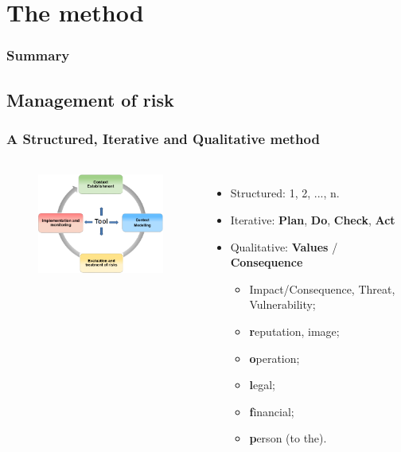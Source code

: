 
%
%
\section{The method}
\begin{frame}
    \frametitle{Summary}
\end{frame}


\subsection{Management of risk}
\begin{frame}
    \frametitle{A Structured, Iterative and Qualitative method}
    \framesubtitle{}
    \begin{columns}[t]
        \column{5.5cm}
        \begin{figure}
        \includegraphics[width=5.5cm]{./images/MONARC-method-1.png}
        \end{figure}
        \column{6.5cm}
        \begin{itemize}
                \item Structured: 1, 2, ..., n.
                \item Iterative: \textbf{Plan}, \textbf{Do}, \textbf{Check}, \textbf{Act}
                \item Qualitative: \textbf{Values} / \textbf{Consequence}
                    \begin{itemize}
                        \item Impact/Consequence, Threat, Vulnerability;
                        \item \textbf{r}eputation, image;
                        \item \textbf{o}peration;
                        \item \textbf{l}egal;
                        \item \textbf{f}inancial;
                        \item \textbf{p}erson (to the).
                    \end{itemize}
        \end{itemize}
        \end{columns}

\end{frame}

